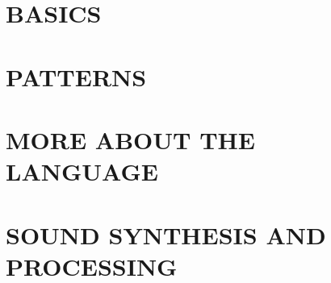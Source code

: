 \documentclass[11pt]{article}
\begin{document}
\vspace*{\fill}
\thispagestyle{empty}
\clearpage

\tableofcontents
\maketitle
{}


\part{BASICS}












\newpage
\part{PATTERNS}



\newpage
\part{MORE ABOUT THE LANGUAGE}








\newpage
\part{SOUND SYNTHESIS AND PROCESSING}



















\newpage
\end{document}
